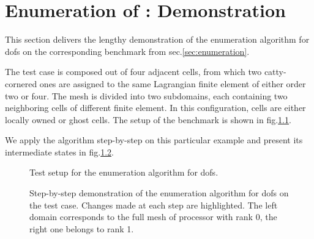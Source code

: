 \chapter{Enumeration of : Demonstration}
\label{app::enumeration}

This section delivers the lengthy demonstration of the enumeration algorithm for \glspl{dof} on the corresponding benchmark from sec.\@ \ref{sec:enumeration}.

The test case is composed out of four adjacent cells, from which two catty-cornered ones are assigned to the same Lagrangian finite element of either order two or four. The mesh is divided into two subdomains, each containing two neighboring cells of different finite element. In this configuration, cells are either locally owned or ghost cells. The setup of the benchmark is shown in fig.\@ \ref{fig:enumdemosetup}.

We apply the algorithm step-by-step on this particular example and present its intermediate states in fig.\@ \ref{fig:enumdemosteps}.

\begin{figure}
  \centering
  \caption{Test setup for the enumeration algorithm for \glspl{dof}.}
  \label{fig:enumdemosetup}
\end{figure}

\begin{figure}
  \centering
  \caption{Step-by-step demonstration of the enumeration algorithm for \glspl{dof} on the test case. Changes made at each step are highlighted. The left domain corresponds to the full mesh of processor with rank 0, the right one belongs to rank 1.}
  \label{fig:enumdemosteps}
\end{figure}